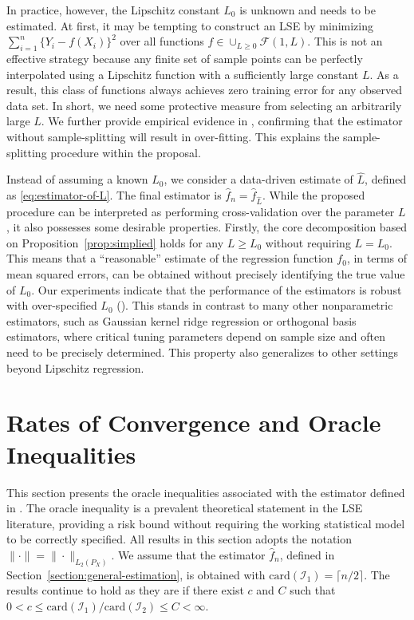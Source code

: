 \documentclass[12pt]{article}
\begin{document}
In practice, however, the Lipschitz constant $L_0$ is unknown and needs to be estimated. At first, it may be tempting to construct an LSE by minimizing $\sum_{i=1}^n \{Y_i - f(X_i)\}^2$ over all functions $f\in\cup_{L\geq 0}\mathcal{F}(1, L)$. This is not an effective strategy because any finite set of sample points can be perfectly interpolated using a Lipschitz function with a sufficiently large constant $L$. As a result, this class of functions always achieves zero training error for any observed data set. In short, we need some protective measure from selecting an arbitrarily large $L$. We further provide empirical evidence in , confirming that the estimator without sample-splitting will result in over-fitting. This explains the sample-splitting procedure within the proposal.

Instead of assuming a known $L_0$, we consider a data-driven estimate of $\widehat L$, defined as \eqref{eq:estimator-of-L}. The final estimator is $\widehat f_n = \widehat f_{\widehat L}$. While the proposed procedure can be interpreted as performing cross-validation over the parameter $L$, it also possesses some desirable properties. Firstly, the core decomposition based on Proposition~\ref{prop:simplied} holds for any $L \ge L_0$ without requiring $L = L_0$. This means that a ``reasonable'' estimate of the regression function $f_0$, in terms of mean squared errors, can be obtained without precisely identifying the true value of $L_0$. Our experiments indicate that the performance of the estimators is robust with over-specified $L_0$ (). This stands in contrast to many other nonparametric estimators, such as Gaussian kernel ridge regression or orthogonal basis estimators, where critical tuning parameters depend on sample size and often need to be precisely determined. This property also generalizes to other settings beyond Lipschitz regression.


\section{Rates of Convergence and Oracle Inequalities}\label{sec:oracle-inequality}
This section presents the oracle inequalities associated with the estimator defined in . The oracle inequality is a prevalent theoretical statement in the LSE literature, providing a risk bound without requiring the working statistical model to be correctly specified. All results in this section adopts the notation $\|\cdot\| =\|\cdot\|_{L_2(P_X)}$. We assume that the estimator $\widehat f_n$, defined in Section~\ref{section:general-estimation}, is obtained with $\mathrm{card}(\mathcal{I}_1) = \lceil n/2 \rceil$. The results continue to hold as they are if there exist $c$ and $C$ such that $0 < c \le \mathrm{card}(\mathcal{I}_1)/\mathrm{card}(\mathcal{I}_2)\le C < \infty$. 
\end{document}
